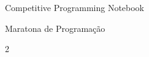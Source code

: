 \documentclass[8pt,a4paper,landscape]{article}
\begin{document}
\begin{center}
    {\Huge Competitive Programming Notebook}

    \vspace{0.2cm}

    Maratona de Programação
\end{center}

\tableofcontents

\newpage

\begin{multicols}{2}


\end{multicols}
\end{document}
